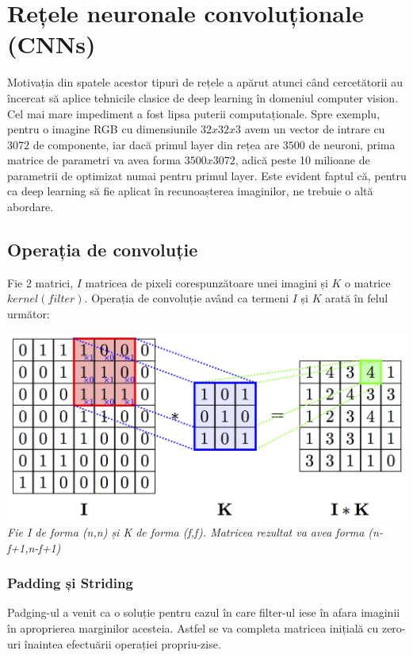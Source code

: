 \section{Rețele neuronale convoluționale (CNNs)}

Motivația din spatele acestor tipuri de rețele a apărut atunci când cercetătorii au încercat să aplice tehnicile clasice de deep learning în domeniul computer vision. Cel mai mare impediment a fost lipsa puterii computaționale. Spre exemplu, pentru o imagine RGB cu dimensiunile $32x32x3$ avem un vector de intrare cu $3072$ de componente, iar dacă primul layer din rețea are $3500$ de neuroni, prima matrice de parametri va avea forma $3500x3072$, adică peste 10 milioane de parametrii de optimizat numai pentru primul layer. Este evident faptul că, pentru ca deep learning să fie aplicat în recunoașterea imaginilor, ne trebuie o altă abordare.

\subsection{Operația de convoluție}
Fie 2 matrici, $I$ matricea de pixeli corespunzătoare unei imagini și $K$ o matrice $kernel (filter)$. Operația de convoluție având ca termeni $I$ și $K$ arată în felul următor:

\begin{center}
\includegraphics[scale=1.5]{convolution} \\
\textit{Fie I de forma (n,n) și K de forma (f,f). Matricea rezultat va avea forma (n-f+1,n-f+1)}
\end{center}


\subsubsection{Padding și Striding}
Padging-ul a venit ca o soluție pentru cazul în care filter-ul iese în afara imaginii în aproprierea marginilor acesteia. Astfel se va completa matricea inițială cu zero-uri înaintea efectuării operației propriu-zise.

